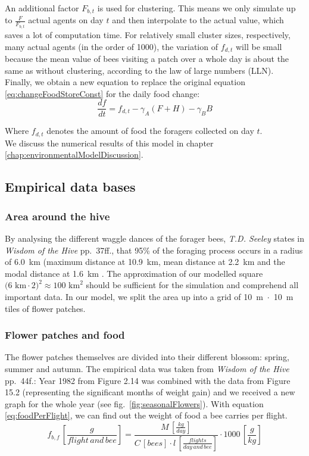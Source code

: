 			An additional factor $F_{b,t}$ is used for clustering. This means we only simulate up to $\frac{F}{F_{b,t}}$ actual agents on day $t$ and then interpolate to the actual value, which saves a lot of computation time. For relatively small cluster sizes, respectively, many actual agents (in the order of 1000), the variation of $f_{d,t}$ will be small because the mean value of bees visiting a patch over a whole day is about the same as without clustering, according to the law of large numbers (LLN).\\
			Finally, we obtain a new equation to replace the original equation \ref{eq:changeFoodStoreConst} for the daily food change:	\begin{equation}\label{eq:changeFoodStoreDyn}
				\frac{df}{dt} = f_{d,t} - \gamma_A (F+H) - \gamma_B B
			\end{equation}
			
			Where $f_{d,t}$ denotes the amount of food the foragers collected on day $t$.\\
			
			We discuss the numerical results of this model in chapter \ref{chap:environmentalModelDiscussion}.
		
	\subsection{Empirical data bases}
		\label{chap:empiricalDataBases}
		\subsubsection{Area around the hive}
			\label{chap:areaAroundTheHive}
			By analysing the different waggle dances of the forager bees, \textit{T.D. Seeley} states in \textit{Wisdom of the Hive} pp.~37ff., that 95\% of the foraging process occurs in a radius of 6.0~km (maximum distance at 10.9~km, mean distance at 2.2~km and the modal distance at 1.6~km \cite{seeley95}. The approximation of our modelled square $\text{(6~km}\cdot\text{2)}^2 \approx \text{100~km}^2$ should be sufficient for the simulation and comprehend all important data. In our model, we split the area up into a grid of 10~m~$\cdot$~10~m tiles of flower patches.
			
		\subsubsection{Flower patches and food}
			\label{chap:flowerPatchesAndFood}
			The flower patches themselves are divided into their different blossom: spring, summer and autumn. The empirical data was taken from \textit{Wisdom of the Hive} pp.~44f.: Year 1982 from Figure 2.14 was combined with the data from Figure 15.2 (representing the significant months of weight gain) and we received a new graph for the whole year (see fig.~\ref{fig:seasonalFlowers}). With equation \ref{eq:foodPerFlight}, we can find out the weight of food a bee carries per flight.
			\begin{equation}\label{eq:foodPerFlight}
						f_{b,f} \,[\frac{g}{flight\, and\, bee}] = \frac{M \,[\frac{kg}{day}]}{C \,[bees] \cdot l \,[\frac{flights}{day \,and\, bee}]}\cdot 1000 \,[\frac{g}{kg}]
			\end{equation}
			
